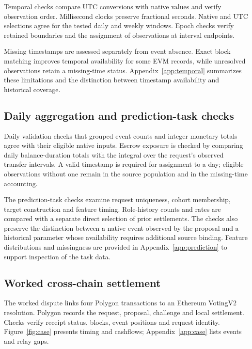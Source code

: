 Temporal checks compare UTC conversions with native values and verify observation order. Millisecond clocks preserve fractional seconds. Native and UTC selections agree for the tested daily and weekly windows. Epoch checks verify retained boundaries and the assignment of observations at interval endpoints.

Missing timestamps are assessed separately from event absence. Exact block matching improves temporal availability for some EVM records, while unresolved observations retain a missing-time status. Appendix~\ref{app:temporal} summarizes these limitations and the distinction between timestamp availability and historical coverage.


\subsection{Daily aggregation and prediction-task checks}

Daily validation checks that grouped event counts and integer monetary totals agree with their eligible native inputs. Escrow exposure is checked by comparing daily balance-duration totals with the integral over the request's observed transfer intervals. A valid timestamp is required for assignment to a day; eligible observations without one remain in the source population and in the missing-time accounting.

The prediction-task checks examine request uniqueness, cohort membership, target construction and feature timing. Role-history counts and rates are compared with a separate direct selection of prior settlements. The checks also preserve the distinction between a native event observed by the proposal and a historical parameter whose availability requires additional source binding. Feature distributions and missingness are provided in Appendix~\ref{app:prediction} to support inspection of the task data.

\subsection{Worked cross-chain settlement}
\label{sec:case}

The worked dispute links four Polygon transactions to an Ethereum VotingV2 resolution. Polygon records the request, proposal, challenge and local settlement. Checks verify receipt status, blocks, event positions and request identity. Figure~\ref{fig:case} presents timing and cashflows; Appendix~\ref{app:case} lists events and relay gaps.

